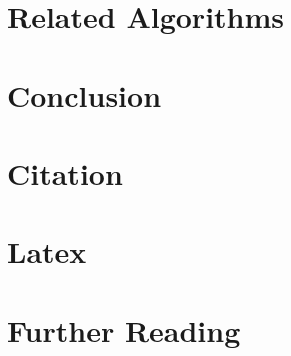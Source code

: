 \documentclass[sigconf]{acmart}
\begin{document}
\section{Related Algorithms}
\label{sec:relatedAlgorithms}


\section{Conclusion}
\label {sec:conclusion}


\section{Citation}
\label{sec:citation}



\section{Latex}
\label{sec:latex} 


\section{Further Reading}
\label{sec:further}




\end{document}
